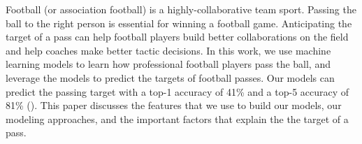 Football (or association football) is a highly-collaborative team sport. 
Passing the ball to the right person is essential for winning a football game.
Anticipating the target of a pass can help football players build better collaborations on the field and help coaches make better tactic decisions.
In this work, we use machine learning models to learn how professional football players pass the ball, and leverage the models to predict the targets of football passes.
Our models can predict the passing target with a top-1 accuracy of 41\% and a top-5 accuracy of 81\% ().
This paper discusses the features that we use to build our models, our modeling approaches, and the important factors that explain the the target of a pass.
